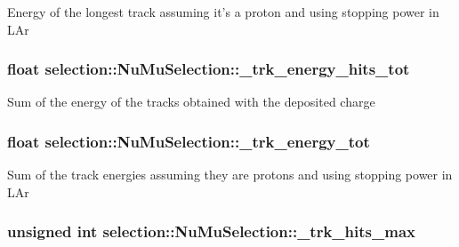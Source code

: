 Energy of the longest track assuming it's a proton and using stopping power in L\-Ar \hypertarget{classselection_1_1NuMuSelection_a62b2fc85963f5b8c09b9a6306afbb84a}{
\subsubsection[{\-\_\-trk\-\_\-energy\-\_\-hits\-\_\-tot}]{\setlength{\rightskip}{0pt plus 5cm}float selection\-::\-Nu\-Mu\-Selection\-::\-\_\-trk\-\_\-energy\-\_\-hits\-\_\-tot\hspace{0.3cm}{\ttfamily [private]}}}\label{classselection_1_1NuMuSelection_a62b2fc85963f5b8c09b9a6306afbb84a}
Sum of the energy of the tracks obtained with the deposited charge \hypertarget{classselection_1_1NuMuSelection_a62638e6a70986b1b5ae81a3cd80e4dc3}{
\subsubsection[{\-\_\-trk\-\_\-energy\-\_\-tot}]{\setlength{\rightskip}{0pt plus 5cm}float selection\-::\-Nu\-Mu\-Selection\-::\-\_\-trk\-\_\-energy\-\_\-tot\hspace{0.3cm}{\ttfamily [private]}}}\label{classselection_1_1NuMuSelection_a62638e6a70986b1b5ae81a3cd80e4dc3}
Sum of the track energies assuming they are protons and using stopping power in L\-Ar \hypertarget{classselection_1_1NuMuSelection_a3e0166490638c0d08a3b66de9ed1ec91}{
\subsubsection[{\-\_\-trk\-\_\-hits\-\_\-max}]{\setlength{\rightskip}{0pt plus 5cm}unsigned int selection\-::\-Nu\-Mu\-Selection\-::\-\_\-trk\-\_\-hits\-\_\-max\hspace{0.3cm}{\ttfamily [private]}}}\label{classselection_1_1NuMuSelection_a3e0166490638c0d08a3b66de9ed1ec91}
